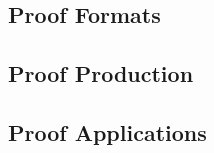 \documentclass{llncs}
\begin{document}
\subsection{Proof Formats}
\subsection{Proof Production}
\subsection{Proof Applications}











\end{document}
